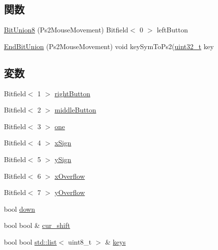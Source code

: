 \subsection*{関数}
\begin{DoxyCompactItemize}
\item 
\hyperlink{namespacePs2_a188d558479ae253a9f17963c50406f58}{BitUnion8} (Ps2MouseMovement) Bitfield$<$ 0 $>$ leftButton
\item 
\hyperlink{namespacePs2_a35af99e63a47d5c34de1ade7d969b743}{EndBitUnion} (Ps2MouseMovement) void keySymToPs2(\hyperlink{Type_8hh_a435d1572bf3f880d55459d9805097f62}{uint32\_\-t} key
\end{DoxyCompactItemize}
\subsection*{変数}
\begin{DoxyCompactItemize}
\item 
Bitfield$<$ 1 $>$ \hyperlink{namespacePs2_a9f14f6a1f4da750d3ef23cf0a52428c5}{rightButton}
\item 
Bitfield$<$ 2 $>$ \hyperlink{namespacePs2_a55b347b21558f05dcfd7e4817c08bb94}{middleButton}
\item 
Bitfield$<$ 3 $>$ \hyperlink{namespacePs2_a1ad8e11da1d27b0aba8a7bd97199ea49}{one}
\item 
Bitfield$<$ 4 $>$ \hyperlink{namespacePs2_a98870caa9bd24727a03e11ce4743b48d}{xSign}
\item 
Bitfield$<$ 5 $>$ \hyperlink{namespacePs2_a9e5e7f9b5d4b0354b04839a29f554cfe}{ySign}
\item 
Bitfield$<$ 6 $>$ \hyperlink{namespacePs2_af3731450409d7bf437330fba9b0f47ad}{xOverflow}
\item 
Bitfield$<$ 7 $>$ \hyperlink{namespacePs2_a1fe8542266acaa70cb542dd34f7a3efd}{yOverflow}
\item 
bool \hyperlink{namespacePs2_ac30355235d44e8f7b0a538a510bcbbeb}{down}
\item 
bool bool \& \hyperlink{namespacePs2_a7110d60593b39f7b7eba87904e2ae359}{cur\_\-shift}
\item 
bool bool \hyperlink{classstd_1_1list}{std::list}$<$ uint8\_\-t $>$ \& \hyperlink{namespacePs2_a9c0125dcc49548ab16bf4d1b20c4b381}{keys}
\end{DoxyCompactItemize}
